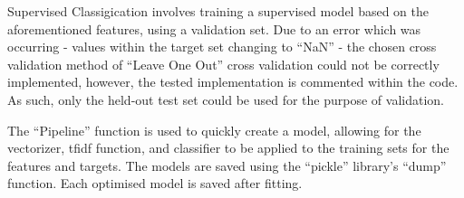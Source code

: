 Supervised Classigication involves training a supervised model based on the
aforementioned features, using a validation set. Due to an error which was
occurring - values within the target set changing to ``NaN'' - the chosen
cross validation method of ``Leave One Out'' cross validation could not be
correctly implemented, however, the tested implementation is commented within
the code. As such, only the held-out test set could be used for the purpose of
validation.

\par The ``Pipeline'' function is used to quickly create a model, allowing for
the vectorizer, tfidf function, and classifier to be applied to the training
sets for the features and targets. The models are saved using the ``pickle''
library's ``dump'' function. Each optimised model is saved after fitting.
